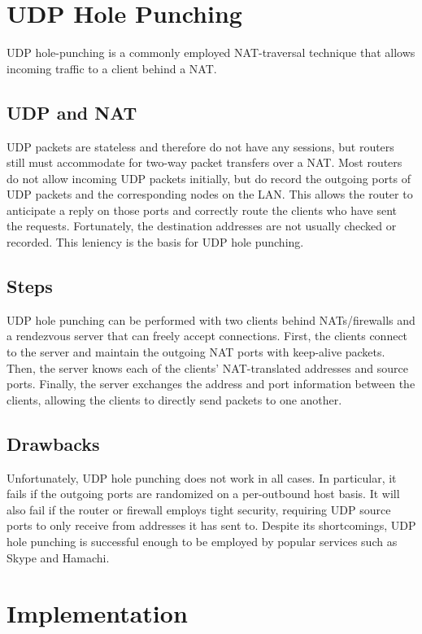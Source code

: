 \documentclass{article}
\begin{document}
\section{UDP Hole Punching}
UDP hole-punching is a commonly employed NAT-traversal technique that allows incoming traffic to a client behind a NAT.

\subsection{UDP and NAT}
UDP packets are stateless and therefore do not have any sessions, but routers still must accommodate for two-way packet transfers over a NAT. Most routers do not allow incoming UDP packets initially, but do record the outgoing ports of UDP packets and the corresponding nodes on the LAN. This allows the router to anticipate a reply on those ports and correctly route the clients who have sent the requests. Fortunately, the destination addresses are not usually checked or recorded. This leniency is the basis for UDP hole punching.

\subsection{Steps}
UDP hole punching can be performed with two clients behind NATs/firewalls and a rendezvous server that can freely accept connections. First, the clients connect to the server and maintain the outgoing NAT ports with keep-alive packets. Then, the server knows each of the clients' NAT-translated addresses and source ports. Finally, the server exchanges the address and port information between the clients, allowing the clients to directly send packets to one another.

\subsection{Drawbacks}
Unfortunately, UDP hole punching does not work in all cases. In particular, it fails if the outgoing ports are randomized on a per-outbound host basis. It will also fail if the router or firewall employs tight security, requiring UDP source ports to only receive from addresses it has sent to. Despite its shortcomings, UDP hole punching is successful enough to be employed by popular services such as Skype and Hamachi.

\section{Implementation}
\end{document}
